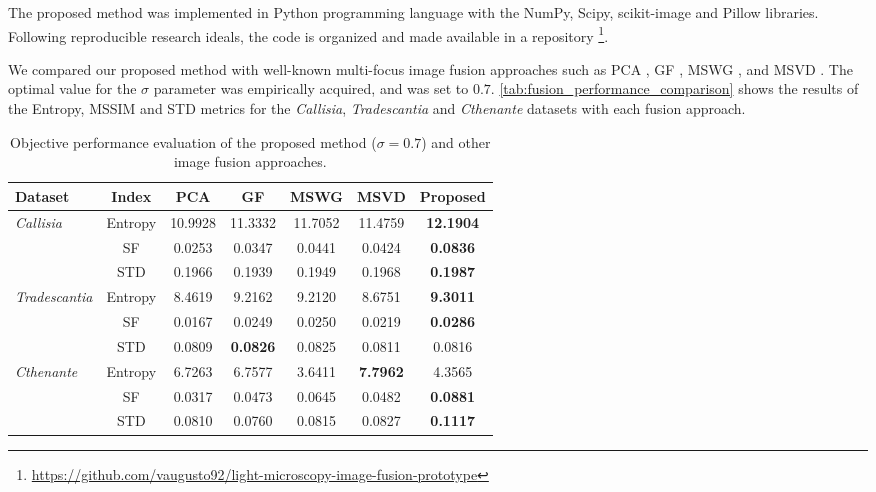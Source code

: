 The proposed method was implemented in Python programming language with the NumPy, Scipy, scikit-image and Pillow libraries. Following reproducible research ideals, the code is organized and made available in a repository \footnote{\url{https://github.com/vaugusto92/light-microscopy-image-fusion-prototype}}.

We compared our proposed method with well-known multi-focus image fusion approaches such as PCA \cite{naidu2008pixel}, GF \cite{li2013image}, MSWG \cite{zhou2014multi}, and MSVD \cite{naidu2011image}. The optimal value for the $\sigma$ parameter was empirically acquired, and was set to $0.7$. \autoref{tab:fusion_performance_comparison} shows the results of the Entropy, MSSIM and STD metrics for the \textit{Callisia}, \textit{Tradescantia} and \textit{Cthenante} datasets with each fusion approach.

\begin{table}[ht]
    \centering
    \caption{Objective performance evaluation of the proposed method ($\sigma = 0.7$) and other image fusion approaches.}
    \label{tab:fusion_performance_comparison}
    \begin{tabular}{lcccccc}
        \toprule
        Dataset & Index & PCA & GF & MSWG & MSVD & \textbf{Proposed}\\
        \midrule
        
        \multirow{3}{*}{\textit{\small Callisia}} 
        & \small Entropy & 10.9928 & 11.3332 & 11.7052 & 11.4759 & \textbf{12.1904}\\
        & \small SF & 0.0253 & 0.0347 & 0.0441 & 0.0424 & \textbf{0.0836}\\
        & \small STD & 0.1966 & 0.1939 & 0.1949 & 0.1968 & \textbf{0.1987}\\
        
        \midrule
        
        \multirow{3}{*}{\textit{\small Tradescantia}}
        & \small Entropy & 8.4619 & 9.2162 & 9.2120 & 8.6751 & \textbf{9.3011}\\
        & \small SF & 0.0167 & 0.0249 & 0.0250 & 0.0219 & \textbf{0.0286}\\
        & \small STD & 0.0809 & \textbf{0.0826} & 0.0825 & 0.0811 & 0.0816\\
        
        \midrule

        \multirow{3}{*}{\textit{\small Cthenante}}
        & \small Entropy & 6.7263 & 6.7577 & 3.6411 & \textbf{7.7962} & 4.3565\\
        & \small SF & 0.0317 & 0.0473 & 0.0645 & 0.0482 & \textbf{0.0881}\\
        & \small STD & 0.0810 & 0.0760 & 0.0815 & 0.0827 & \textbf{0.1117}\\

        \bottomrule
    \end{tabular}
    \centering
    \fautor
\end{table}

